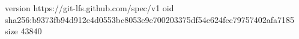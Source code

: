 version https://git-lfs.github.com/spec/v1
oid sha256:b9373fb94d912e4d0553bc8053e9e700203375df54e624fcc79757402afa7185
size 43840
